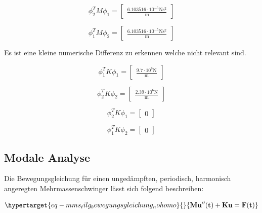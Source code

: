 \documentclass[
  letterpaper,
  DIV=11]{scrreprt}
\begin{document}
\begin{equation}\phi_{2}^{T} M \phi_{1} = \left[\begin{matrix}\frac{6.103516 \cdot 10^{-5} \text{N} \text{s}^{2}}{\text{m}}\end{matrix}\right]\end{equation}

\begin{equation}\phi_{1}^{T} M \phi_{2} = \left[\begin{matrix}\frac{6.103516 \cdot 10^{-5} \text{N} \text{s}^{2}}{\text{m}}\end{matrix}\right]\end{equation}

Es ist eine kleine numerische Differenz zu erkennen welche nicht
relevant sind.

\begin{equation}\phi_{1}^{T} K \phi_{1} = \left[\begin{matrix}\frac{9.7 \cdot 10^{6} \text{N}}{\text{m}}\end{matrix}\right]\end{equation}

\begin{equation}\phi_{2}^{T} K \phi_{2} = \left[\begin{matrix}\frac{2.39 \cdot 10^{6} \text{N}}{\text{m}}\end{matrix}\right]\end{equation}

\begin{equation}\phi_{2}^{T} K \phi_{1} = \left[\begin{matrix}0\end{matrix}\right]\end{equation}

\begin{equation}\phi_{1}^{T} K \phi_{2} = \left[\begin{matrix}0\end{matrix}\right]\end{equation}

\hypertarget{modale-analyse}{%
\subsection{Modale Analyse}\label{modale-analyse}}

Die Bewegungsgleichung für einen ungedämpften, periodisch, harmonisch
angeregten Mehrmassenschwinger lässt sich folgend beschreiben:

\begin{equation}\protect\hypertarget{eq-mms_tilg_bewegungsgleichung_nohomo}{}{
\mathbf{M u''(t) + K u = F(t)}
}\label{eq-mms_tilg_bewegungsgleichung_nohomo}\end{equation}
\end{document}

